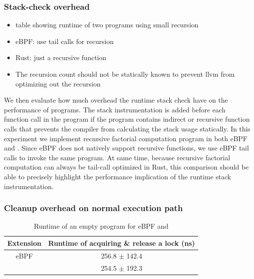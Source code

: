 \subsubsection{Stack-check overhead}
\begin{itemize}
    \item table showing runtime of two programs using small recursion
    \item eBPF: use tail calls for recursion
    \item Rust: just a recursive function
    \item The recursion count should not be statically known to prevent llvm
        from optimizing out the recursion
\end{itemize}

We then evaluate how much overhead the runtime stack check have on the
    performance of \projname{} programs.
The stack instrumentation is added before each
    function call in the \projname{} program if the program contains indirect
    or recursive function calls that prevents the compiler from calculating the
    stack usage statically.
In this experiment we implement recursive factorial computation program in both
    eBPF and \projname{}.
Since eBPF does not natively support recursive functions, we use eBPF tail
    calls to invoke the same program.
At same time, because recursive factorial computation can always be tail-call
    optimized in Rust, this comparison should be able to precisely highlight
    the performance implication of the runtime stack instrumentation.

\subsubsection{Cleanup overhead on normal execution path}
\begin{table}[t]
    \small
    \centering
    \begin{tabular}{cc}%
        \toprule
        \textbf{Extension} & \textbf{Runtime of acquiring \& release a lock (ns)} \\
        \midrule
        eBPF & 256.8 $\pm$ 142.4 \\
        \projname{} & 254.5 $\pm$ 192.3 \\
        \bottomrule
    \end{tabular}
    \caption{Runtime of an empty program for eBPF and \projname{}}
    \vspace{-10pt}
    \label{fig:startup-overhead}
\end{table}

